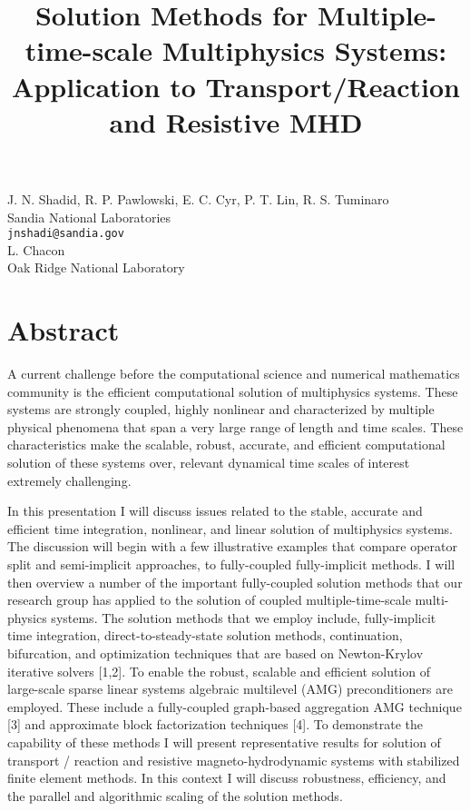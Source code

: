 

\title{Solution Methods for Multiple-time-scale Multiphysics Systems: Application to Transport/Reaction and Resistive MHD}
\author{} \institute{} %
\maketitle
\begin{center}
{\large J. N. Shadid, R. P. Pawlowski, E. C. Cyr, P. T. Lin, R. S. Tuminaro}\\
Sandia National Laboratories\\
{\tt jnshadi@sandia.gov}\\
\vspace{4mm} %
{\large L. Chacon}\\
Oak Ridge National Laboratory\\
\end{center}

\section*{Abstract}

A current challenge before the computational science and numerical
mathematics community is the efficient computational solution of
multiphysics systems.  These systems are strongly coupled, highly
nonlinear and characterized by multiple physical phenomena that span a
very large range of length and time scales.  
These characteristics make the scalable, robust, 
accurate, and efficient computational solution of these systems over,
relevant dynamical time scales of interest extremely challenging.

In this presentation I will discuss issues related to the stable,
accurate and efficient time integration, nonlinear, and linear solution of
multiphysics systems. The discussion will begin with a few illustrative
examples that compare operator split and semi-implicit
approaches, to fully-coupled fully-implicit methods. 
I will then overview a number of the important fully-coupled 
solution methods that our research group has applied to 
the solution of coupled multiple-time-scale
multi-physics systems. 
The solution methods that we employ
include, fully-implicit time integration, direct-to-steady-state
solution methods, continuation, bifurcation, and optimization
techniques that are based on Newton-Krylov iterative solvers [1,2].  
To enable the robust, scalable and efficient solution of large-scale sparse 
linear systems algebraic multilevel (AMG) preconditioners are employed. 
These include a fully-coupled graph-based aggregation AMG technique [3] and 
approximate block factorization techniques [4].
To demonstrate the capability of these methods I will present
representative results for solution of transport / reaction and resistive 
magneto-hydrodynamic systems with stabilized finite element methods. 
In this context I will discuss robustness, efficiency, and the parallel and algorithmic
scaling of the solution methods.

